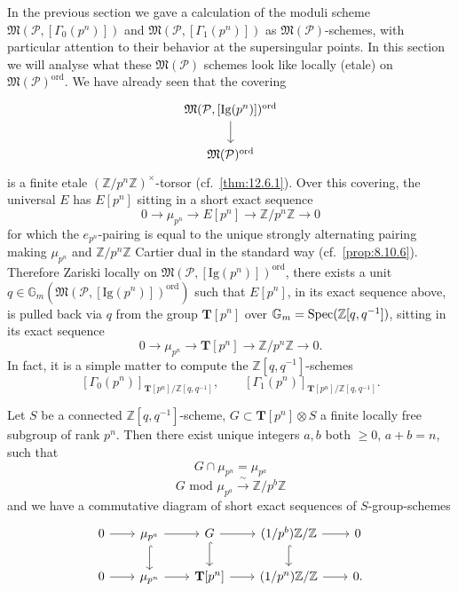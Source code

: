 \kmitem\label{item:13.6.1}In the previous section we gave a calculation of the moduli scheme $\mathfrak{M}(\mathcal{P},[\Gamma_0(p^n)])$ and $\mathfrak{M}(\mathcal{P},[\Gamma_1(p^n)])$ as $\mathfrak{M}(\mathcal{P})$-schemes, with particular attention to their behavior at the supersingular points. In this section we will analyse what these $\mathfrak{M}(\mathcal{P})$ schemes look like locally (etale) on $\mathfrak{M}(\mathcal{P})^{\mathrm{ord}}$. We have already seen that the covering
\[
\begin{tikzcd}[row sep=1.8em]
\mathfrak{M}(\mathcal{P},[\mathrm{Ig}(p^n)])^{\mathrm{ord}} \arrow[d] \\
\mathfrak{M}(\mathcal{P})^{\mathrm{ord}}
\end{tikzcd}
\]
is a finite etale $(\mathbb{Z}/p^n\mathbb{Z})^\times$-torsor (cf.~\ref{thm:12.6.1}). Over this covering, the universal $E$ has $E[p^n]$ sitting in a short exact sequence
\[
0 \to \mu_{p^n} \to E[p^n] \to \mathbb{Z}/p^n\mathbb{Z} \to 0
\]
for which the $e_{p^n}$-pairing is equal to the unique strongly alternating pairing making $\mu_{p^n}$ and $\mathbb{Z}/p^n\mathbb{Z}$ Cartier dual in the standard way (cf.~\ref{prop:8.10.6}). Therefore Zariski locally on $\mathfrak{M}(\mathcal{P},[\mathrm{Ig}(p^n)])^{\mathrm{ord}}$, there exists a unit $q \in \mathbb{G}_m(\mathfrak{M}(\mathcal{P},[\mathrm{Ig}(p^n)])^{\mathrm{ord}})$ such that $E[p^n]$, in its exact sequence above, is pulled back via $q$ from the group $\mathbf{T}[p^n]$ over $\mathbb{G}_m = \operatorname{Spec}(\mathbb{Z}[q,q^{-1}])$, sitting in its exact sequence
\[
0 \to \mu_{p^n} \to \mathbf{T}[p^n] \to \mathbb{Z}/p^n\mathbb{Z} \to 0 .
\]
In fact, it is a simple matter to compute the $\mathbb{Z}[q,q^{-1}]$-schemes
\[
[\Gamma_0(p^n)]_{\mathbf{T}[p^n]/\mathbb{Z}[q,q^{-1}]}, \qquad [\Gamma_1(p^n)]_{\mathbf{T}[p^n]/\mathbb{Z}[q,q^{-1}]} .
\]

\begin{kprop}\label{prop:13.6.2}
Let $S$ be a connected $\mathbb{Z}[q,q^{-1}]$-scheme, $G \subset \mathbf{T}[p^n] \otimes S$ a finite locally free subgroup of rank $p^n$. Then there exist unique integers $a, b$ both $\ge 0$, $a + b = n$, such that
\[
G \cap \mu_{p^n} = \mu_{p^a}
\]
\[
G \text{ mod } \mu_{p^a} \xrightarrow{\ \sim\ } \mathbb{Z}/p^b\mathbb{Z}
\]
and we have a commutative diagram of short exact sequences of $S$-group-schemes
\[
\begin{tikzcd}[row sep=1.7em, column sep=2.0em]
0 \arrow[r] & \mu_{p^a} \arrow[r] \arrow[d, hook] & G \arrow[r] \arrow[d, hook] & (1/p^b)\mathbb{Z}/\mathbb{Z} \arrow[r] \arrow[d, hook] & 0 \\
0 \arrow[r] & \mu_{p^n} \arrow[r] & \mathbf{T}[p^n] \arrow[r] & (1/p^n)\mathbb{Z}/\mathbb{Z} \arrow[r] & 0 .
\end{tikzcd}
\]
\end{kprop}

